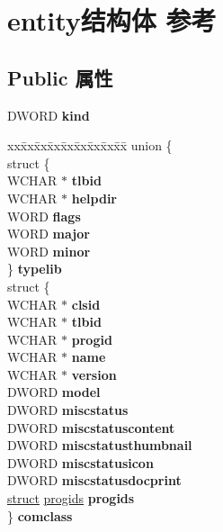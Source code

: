 \hypertarget{structentity}{}\section{entity结构体 参考}
\label{structentity}
\subsection*{Public 属性}
\begin{DoxyCompactItemize}
\item 
\mbox{\label{structentity_ad1d1d7b81b72c275c97294eb54c76451}} 
D\+W\+O\+RD {\bfseries kind}
\item 
\mbox{\label{structentity_a15eb1879507f9903c213fb36cf7919a7}} 
\begin{tabbing}
xx\=xx\=xx\=xx\=xx\=xx\=xx\=xx\=xx\=\kill
union \{\\
\>struct \{\\
\>\>WCHAR $\ast$ {\bfseries tlbid}\\
\>\>WCHAR $\ast$ {\bfseries helpdir}\\
\>\>WORD {\bfseries flags}\\
\>\>WORD {\bfseries major}\\
\>\>WORD {\bfseries minor}\\
\>\} {\bfseries typelib}\\
\>struct \{\\
\>\>WCHAR $\ast$ {\bfseries clsid}\\
\>\>WCHAR $\ast$ {\bfseries tlbid}\\
\>\>WCHAR $\ast$ {\bfseries progid}\\
\>\>WCHAR $\ast$ {\bfseries name}\\
\>\>WCHAR $\ast$ {\bfseries version}\\
\>\>DWORD {\bfseries model}\\
\>\>DWORD {\bfseries miscstatus}\\
\>\>DWORD {\bfseries miscstatuscontent}\\
\>\>DWORD {\bfseries miscstatusthumbnail}\\
\>\>DWORD {\bfseries miscstatusicon}\\
\>\>DWORD {\bfseries miscstatusdocprint}\\
\>\>\hyperlink{interfacestruct}{struct} \hyperlink{structprogids}{progids} {\bfseries progids}\\
\>\} {\bfseries comclass}\\

\end{tabbing}
\end{DoxyCompactItemize}
